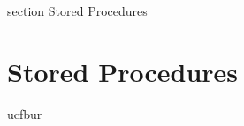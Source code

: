 

 {section} {Stored Procedures}
\section*{Stored Procedures}

ucfbur
\label{Stored Procedures}
\clearpage